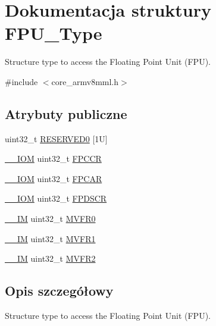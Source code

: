 \hypertarget{struct_f_p_u___type}{}\section{Dokumentacja struktury F\+P\+U\+\_\+\+Type}
\label{struct_f_p_u___type}


Structure type to access the Floating Point Unit (F\+PU).  




{\ttfamily \#include $<$core\+\_\+armv8mml.\+h$>$}

\subsection*{Atrybuty publiczne}
\begin{DoxyCompactItemize}
\item 
uint32\+\_\+t \hyperlink{struct_f_p_u___type_aeab77b3f17bf5a628cb743807d8fde7e}{R\+E\+S\+E\+R\+V\+E\+D0} \mbox{[}1\+U\mbox{]}
\item 
\hyperlink{core__sc300_8h_ab6caba5853a60a17e8e04499b52bf691}{\+\_\+\+\_\+\+I\+OM} uint32\+\_\+t \hyperlink{struct_f_p_u___type_af1b708c5e413739150df3d16ca3b7061}{F\+P\+C\+CR}
\item 
\hyperlink{core__sc300_8h_ab6caba5853a60a17e8e04499b52bf691}{\+\_\+\+\_\+\+I\+OM} uint32\+\_\+t \hyperlink{struct_f_p_u___type_a55263b468d0f8e11ac77aec9ff87c820}{F\+P\+C\+AR}
\item 
\hyperlink{core__sc300_8h_ab6caba5853a60a17e8e04499b52bf691}{\+\_\+\+\_\+\+I\+OM} uint32\+\_\+t \hyperlink{struct_f_p_u___type_a58d1989664a06db6ec2e122eefa9f04a}{F\+P\+D\+S\+CR}
\item 
\hyperlink{core__sc300_8h_a4cc1649793116d7c2d8afce7a4ffce43}{\+\_\+\+\_\+\+IM} uint32\+\_\+t \hyperlink{struct_f_p_u___type_a4f19014defe6033d070b80af19ef627c}{M\+V\+F\+R0}
\item 
\hyperlink{core__sc300_8h_a4cc1649793116d7c2d8afce7a4ffce43}{\+\_\+\+\_\+\+IM} uint32\+\_\+t \hyperlink{struct_f_p_u___type_a66f8cfa49a423b480001a4e101bf842d}{M\+V\+F\+R1}
\item 
\hyperlink{core__sc300_8h_a4cc1649793116d7c2d8afce7a4ffce43}{\+\_\+\+\_\+\+IM} uint32\+\_\+t \hyperlink{struct_f_p_u___type_a479130e53a8b3c36fd8ee38b503a3911}{M\+V\+F\+R2}
\end{DoxyCompactItemize}


\subsection{Opis szczegółowy}
Structure type to access the Floating Point Unit (F\+PU). 

